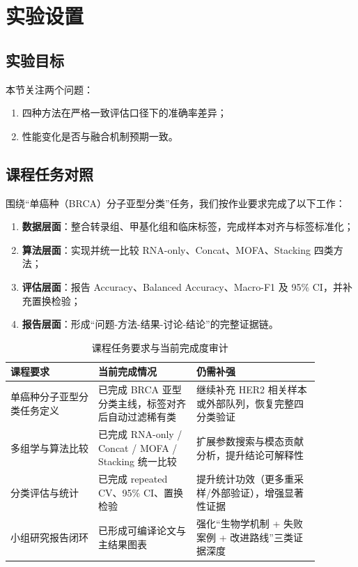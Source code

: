 \section{实验设置}

\subsection{实验目标}

本节关注两个问题：

\begin{enumerate}
    \item 四种方法在严格一致评估口径下的准确率差异；
    \item 性能变化是否与融合机制预期一致。
\end{enumerate}

\subsection{课程任务对照}

围绕“单癌种（BRCA）分子亚型分类”任务，我们按作业要求完成了以下工作：

\begin{enumerate}
    \item \textbf{数据层面}：整合转录组、甲基化组和临床标签，完成样本对齐与标签标准化；
    \item \textbf{算法层面}：实现并统一比较 RNA-only、Concat、MOFA、Stacking 四类方法；
    \item \textbf{评估层面}：报告 Accuracy、Balanced Accuracy、Macro-F1 及 95\% CI，并补充置换检验；
    \item \textbf{报告层面}：形成“问题-方法-结果-讨论-结论”的完整证据链。
\end{enumerate}

\begin{table}[H]
\centering
\caption{课程任务要求与当前完成度审计}
\label{tab:course-audit}
\begin{tabular}{p{0.25\linewidth}p{0.28\linewidth}p{0.35\linewidth}}
\toprule
课程要求 & 当前完成情况 & 仍需补强 \\
\midrule
单癌种分子亚型分类任务定义 & 已完成 BRCA 亚型分类主线，标签对齐后自动过滤稀有类 & 继续补充 HER2 相关样本或外部队列，恢复完整四分类验证 \\
多组学与算法比较 & 已完成 RNA-only / Concat / MOFA / Stacking 统一比较 & 扩展参数搜索与模态贡献分析，提升结论可解释性 \\
分类评估与统计 & 已完成 repeated CV、95\% CI、置换检验 & 提升统计功效（更多重采样/外部验证），增强显著性证据 \\
小组研究报告闭环 & 已形成可编译论文与主结果图表 & 强化“生物学机制 + 失败案例 + 改进路线”三类证据深度 \\
\bottomrule
\end{tabular}
\end{table}

